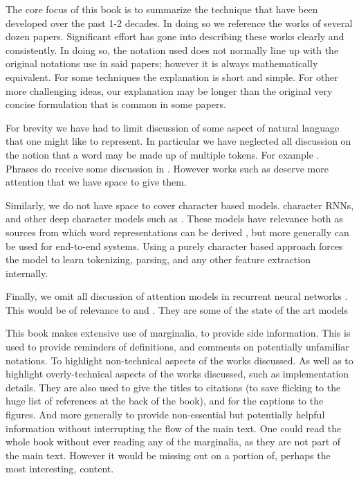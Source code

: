 \documentclass[12pt,parskip]{komatufte}
\begin{document}
The core focus of this book is to summarize the technique that have been developed over the past 1-2 decades.
In doing so we reference the works of several dozen papers.
Significant effort has gone into describing these works clearly and consistently.
In doing so, the notation used does not normally line up with the original notations use in said papers; however it is always mathematically equivalent.
For some techniques the explanation is short and simple.
For other more challenging ideas, our explanation may be longer than the original very concise formulation that is common in some papers.





For brevity we have had to limit discussion of some aspect of natural language that one might like to represent.
In particular we have neglected all discussion on the notion that a word may be made up of multiple tokens.
For example .
Phrases do receive some discussion in .
However works such as  deserve more attention that we have space to give them.

Similarly, we do not have space to cover character based models.
character RNNs, and other deep character models such as .
These models have relevance both as sources from which word representations can be derived ,
but more generally can be used for end-to-end systems.
Using a purely character based approach forces the model to learn tokenizing, parsing, and any other feature extraction internally.

Finally, we omit all discussion of attention models in recurrent neural networks .
This would be of relevance to  and .
They are some of the state of the art models



This book makes extensive use of marginalia, to provide side information.
This is used to provide reminders of definitions, and comments on potentially unfamiliar notations.
To highlight non-technical aspects of the works discussed.
As well as to highlight overly-technical aspects of the works discussed, such as implementation details.
They are also used to give the titles to citations (to save flicking to the huge list of references at the back of the book), and for the captions to the figures.
And more generally to provide non-essential  but potentially helpful information without interrupting the flow of the main text.
One could read the whole book without ever reading any of the marginalia,
as they are not part of the main text.
However it would be missing out on a portion of, perhaps the most interesting, content.
\end{document}

